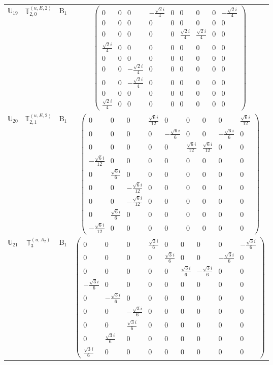 \documentclass[fleqn,10pt,landscape]{article}
\begin{document}
\begin{itemize}
\begin{center}
\begin{longtable}{c|c|c|c}
$ \mathbb{U}_{19} $ & $\mathbb{T}_{2,0}^{(u,E,2)}$ & B$_{1}$ & $\begin{pmatrix} 0 & 0 & 0 & - \frac{\sqrt{2} i}{4} & 0 & 0 & 0 & 0 & - \frac{\sqrt{2} i}{4} \\ 0 & 0 & 0 & 0 & 0 & 0 & 0 & 0 & 0 \\ 0 & 0 & 0 & 0 & 0 & \frac{\sqrt{2} i}{4} & \frac{\sqrt{2} i}{4} & 0 & 0 \\ \frac{\sqrt{2} i}{4} & 0 & 0 & 0 & 0 & 0 & 0 & 0 & 0 \\ 0 & 0 & 0 & 0 & 0 & 0 & 0 & 0 & 0 \\ 0 & 0 & - \frac{\sqrt{2} i}{4} & 0 & 0 & 0 & 0 & 0 & 0 \\ 0 & 0 & - \frac{\sqrt{2} i}{4} & 0 & 0 & 0 & 0 & 0 & 0 \\ 0 & 0 & 0 & 0 & 0 & 0 & 0 & 0 & 0 \\ \frac{\sqrt{2} i}{4} & 0 & 0 & 0 & 0 & 0 & 0 & 0 & 0 \end{pmatrix}$ \\
$ \mathbb{U}_{20} $ & $\mathbb{T}_{2,1}^{(u,E,2)}$ & B$_{1}$ & $\begin{pmatrix} 0 & 0 & 0 & \frac{\sqrt{6} i}{12} & 0 & 0 & 0 & 0 & \frac{\sqrt{6} i}{12} \\ 0 & 0 & 0 & 0 & - \frac{\sqrt{6} i}{6} & 0 & 0 & - \frac{\sqrt{6} i}{6} & 0 \\ 0 & 0 & 0 & 0 & 0 & \frac{\sqrt{6} i}{12} & \frac{\sqrt{6} i}{12} & 0 & 0 \\ - \frac{\sqrt{6} i}{12} & 0 & 0 & 0 & 0 & 0 & 0 & 0 & 0 \\ 0 & \frac{\sqrt{6} i}{6} & 0 & 0 & 0 & 0 & 0 & 0 & 0 \\ 0 & 0 & - \frac{\sqrt{6} i}{12} & 0 & 0 & 0 & 0 & 0 & 0 \\ 0 & 0 & - \frac{\sqrt{6} i}{12} & 0 & 0 & 0 & 0 & 0 & 0 \\ 0 & \frac{\sqrt{6} i}{6} & 0 & 0 & 0 & 0 & 0 & 0 & 0 \\ - \frac{\sqrt{6} i}{12} & 0 & 0 & 0 & 0 & 0 & 0 & 0 & 0 \end{pmatrix}$ \\
$ \mathbb{U}_{21} $ & $\mathbb{T}_{3}^{(u,A_{2})}$ & B$_{1}$ & $\begin{pmatrix} 0 & 0 & 0 & \frac{\sqrt{3} i}{6} & 0 & 0 & 0 & 0 & - \frac{\sqrt{3} i}{6} \\ 0 & 0 & 0 & 0 & \frac{\sqrt{3} i}{6} & 0 & 0 & - \frac{\sqrt{3} i}{6} & 0 \\ 0 & 0 & 0 & 0 & 0 & \frac{\sqrt{3} i}{6} & - \frac{\sqrt{3} i}{6} & 0 & 0 \\ - \frac{\sqrt{3} i}{6} & 0 & 0 & 0 & 0 & 0 & 0 & 0 & 0 \\ 0 & - \frac{\sqrt{3} i}{6} & 0 & 0 & 0 & 0 & 0 & 0 & 0 \\ 0 & 0 & - \frac{\sqrt{3} i}{6} & 0 & 0 & 0 & 0 & 0 & 0 \\ 0 & 0 & \frac{\sqrt{3} i}{6} & 0 & 0 & 0 & 0 & 0 & 0 \\ 0 & \frac{\sqrt{3} i}{6} & 0 & 0 & 0 & 0 & 0 & 0 & 0 \\ \frac{\sqrt{3} i}{6} & 0 & 0 & 0 & 0 & 0 & 0 & 0 & 0 \end{pmatrix}$ \\

\end{longtable}
\end{center}
\end{itemize}
\end{document}
